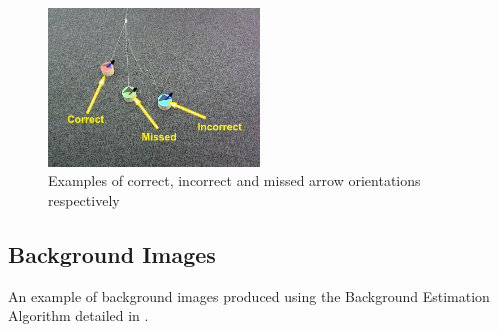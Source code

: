 \documentclass{article}
\begin{document}
\begin{figure}[h!]
	\centering
		\includegraphics[width=0.5\textwidth]{../Drawings/missedandIncorrectDetData2Ready.pdf}
	\caption{Examples of correct, incorrect and missed arrow orientations respectively}
	\label{fig:indetect}
\end{figure}


\subsection{Background Images}
\label{sec:back}
An example of background images produced using the Background Estimation Algorithm detailed in .
\end{document}
